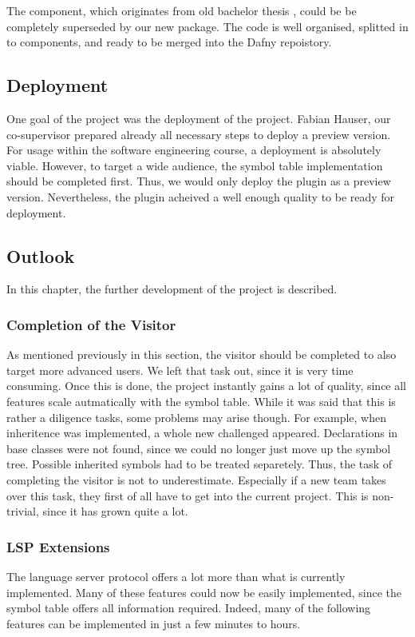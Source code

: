 The  component, which originates from old bachelor thesis \cite{ba}, could be be completely superseded by our new  package.
The code is well organised, splitted in to components, and ready to be merged into the Dafny repoistory.

\subsection{Deployment}
One goal of the project was the deployment of the project.
Fabian Hauser, our co-supervisor prepared already all necessary steps to deploy a preview version.
For usage within the software engineering course, a deployment is absolutely viable.
However, to target a wide audience, the symbol table implementation should be completed first.
Thus, we would only deploy the plugin as a preview version.
Nevertheless, the plugin acheived a well enough quality to be ready for deployment.

\subsection{Outlook}
In this chapter, the further development of the project is described.

\subsubsection{Completion of the Visitor}
As mentioned previously in this section, the visitor should be completed to also target more advanced users.
We left that task out, since it is very time consuming.
Once this is done, the project instantly gains a lot of quality, since all features scale autmatically with the symbol table.
While it was said that this is rather a diligence tasks, some problems may arise though.
For example, when inheritence was implemented, a whole new challenged appeared.
Declarations in base classes were not found, since we could no longer just move up the symbol tree.
Possible inherited symbols had to be treated separetely.
Thus, the task of completing the visitor is not to underestimate.
Especially if a new team takes over this task, they first of all have to get into the current project.
This is non-trivial, since it has grown quite a lot.



\subsubsection{LSP Extensions}
The language server protocol \cite{lspspec} offers a lot more than what is currently implemented.
Many of these features could now be easily implemented, since the symbol table offers all information required.
Indeed, many of the following features can be implemented in just a few minutes to hours.

